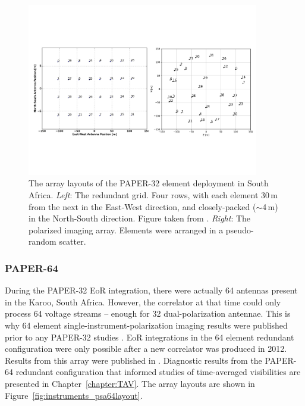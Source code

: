 \begin{figure}
\centering
\includegraphics[width=0.9\textwidth]{chapters/instruments/figures/psa32_layouts.pdf}
\caption[The array layouts of the PAPER-32 element deployment in South Africa.]{The array layouts of the PAPER-32 element deployment in South Africa. \textit{Left}: The redundant grid. Four rows, with each element 30\,m from the next in the East-West direction, and closely-packed ($\sim$4\,m) in the North-South direction. Figure taken from \cite{Parsons.14}. \textit{Right}: The polarized imaging array. Elements were arranged in a pseudo-random scatter.}
\label{fig:instruments_psa32layout}
\end{figure}

\subsubsection{PAPER-64}

During the PAPER-32 EoR integration, there were actually 64 antennas present in the Karoo, South Africa. However, the correlator at that time could only process 64 voltage streams -- enough for 32 dual-polarization antennae. This is why 64 element single-instrument-polarization imaging results were published prior to any PAPER-32 studies \citep{Jacobs.13, Stefan.13}. EoR integrations in the 64 element redundant configuration were only possible after a new correlator was produced in 2012. Results from this array were published in \cite[][{\color{red}Cheng et al. \textit{in prep.}, Kolopanis et al. \textit{in prep.}}]{Ali.15, Pober.15}. Diagnostic results from the PAPER-64 redundant configuration that informed studies of time-averaged visibilities are presented in Chapter~\ref{chapter:TAV}. The array layouts are shown in Figure~\ref{fig:instruments_psa64layout}.

